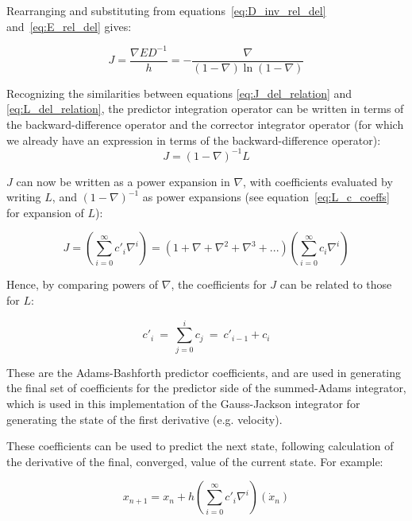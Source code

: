 Rearranging and substituting from equations~\ref{eq:D_inv_rel_del} 
and~\ref{eq:E_rel_del} gives:

\begin{equation} \label{eq:J_del_relation}
J = \frac{\nabla ED^{-1}}{h} = -\frac{\nabla }{(1-\nabla )\ln(1-\nabla )}
\end{equation}

Recognizing the similarities between equations
\ref{eq:J_del_relation} and \ref{eq:L_del_relation}, the predictor integration
operator can be written in terms of the backward-difference operator and the
corrector integrator operator (for which we already have an expression in
terms of the backward-difference operator):
\begin{equation}
J = (1-\nabla )^{-1}L 
\end{equation}

$J$ can now be written as a power expansion in $\nabla$, with coefficients 
evaluated by writing $L$, and $(1-\nabla)^{-1}$ as power expansions (see 
equation~\ref{eq:L_c_coeffs} for expansion of $L$):

\begin{equation*}
J=\left(\sum_{i=0}^{\infty }c'_{i}\nabla ^{i}\right) = 
\left(1+\nabla +\nabla ^{2}+\nabla ^{3}+...\right)\left(\sum _{i=0}^{\infty 
}c_{i}\nabla ^{i}\right)
\end{equation*}

Hence, by comparing powers of $\nabla$, the coefficients for $J$ can be 
related to those for $L$:

\begin{equation*}
c'_{i}\ =\ \sum _{j=0}^{i}c_{j}\ =\ c'_{i-1}+c_{i}
\end{equation*}

These are the Adams-Bashforth predictor coefficients, and are used in
generating the final set of coefficients for the predictor side of the
summed-Adams integrator, which is used in this implementation of the 
Gauss-Jackson
integrator for generating the state of the first derivative (e.g. velocity).

These coefficients can be used to predict the next state, following
calculation of the derivative of the final, converged, value of the current 
state.
For example:


\begin{equation} \label{eq:adams_bashforth}
x_{n+1}=x_{n}+h\left(\sum _{i=0}^{\infty}c'_{i}\nabla ^{i}\right)(\dot{x}_{n})
\end{equation}






